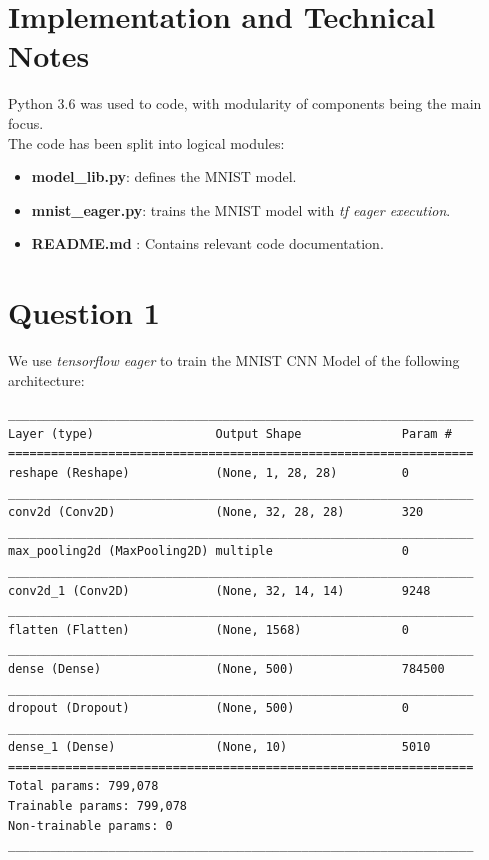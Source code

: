 \section {Implementation and Technical Notes}

Python 3.6 was used to code, with modularity of components being the main focus. \\

The code has been split into logical modules: \\
\begin{itemize}
\item \textbf{model\_lib.py}: defines the MNIST model. 
\item \textbf{mnist\_eager.py}: trains the MNIST model with \textit{tf eager execution}. 
\item  \textbf{README.md }: Contains relevant code documentation.
\end{itemize}


\section {Question 1}

We use \textit{tensorflow eager} to train the MNIST CNN Model of the following architecture:

\begin{lstlisting}
_________________________________________________________________
Layer (type)                 Output Shape              Param #   
=================================================================
reshape (Reshape)            (None, 1, 28, 28)         0         
_________________________________________________________________
conv2d (Conv2D)              (None, 32, 28, 28)        320       
_________________________________________________________________
max_pooling2d (MaxPooling2D) multiple                  0         
_________________________________________________________________
conv2d_1 (Conv2D)            (None, 32, 14, 14)        9248      
_________________________________________________________________
flatten (Flatten)            (None, 1568)              0         
_________________________________________________________________
dense (Dense)                (None, 500)               784500    
_________________________________________________________________
dropout (Dropout)            (None, 500)               0         
_________________________________________________________________
dense_1 (Dense)              (None, 10)                5010      
=================================================================
Total params: 799,078
Trainable params: 799,078
Non-trainable params: 0
_________________________________________________________________
\end{lstlisting}

